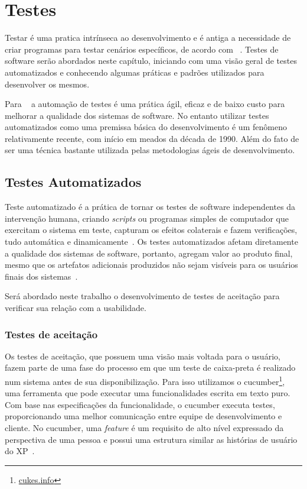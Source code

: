 
\chapter{Testes}
\label{cap:testes}

Testar é uma pratica intrínseca ao desenvolvimento e é antiga a necessidade de
criar programas para testar cenários específicos, de acordo com ~.
%
Testes de software serão abordados neste capítulo, iniciando com uma visão geral de testes 
automatizados e conhecendo algumas práticas e padrões utilizados para desenvolver
os mesmos.

Para ~ a automação de testes é uma prática ágil, eficaz e de baixo custo para melhorar
a qualidade dos sistemas de software. No entanto utilizar testes automatizados 
como uma premissa básica do desenvolvimento é um fenômeno relativamente recente, 
com início em meados  da década de 1990. Além do fato de ser uma técnica bastante utilizada pelas metodologias ágeis
de desenvolvimento.


\section{Testes Automatizados}

Teste automatizado é a prática de tornar os testes de software independentes da
intervenção humana, criando \textit{scripts} ou programas simples de computador que exercitam 
o sistema em teste, capturam os efeitos colaterais e fazem verificações, tudo 
automática e dinamicamente~\cite{meszaros2007}.
%
Os testes automatizados afetam diretamente a qualidade dos sistemas de software,
portanto, agregam valor  ao produto final, mesmo que os artefatos adicionais
produzidos não sejam visíveis para os usuários finais dos sistemas~\cite{bernardo2011}.

Será abordado neste trabalho o desenvolvimento de testes de aceitação para verificar sua relação com a usabilidade. 

\subsection{Testes de aceitação}

Os testes de aceitação, que possuem uma visão mais voltada para o usuário, fazem 
parte de uma fase do processo em que um teste de caixa-preta é realizado 
num sistema antes de sua disponibilização.
Para isso utilizamos o cucumber\footnote{\url{cukes.info}}, uma ferramenta que pode executar uma funcionalidades escrita em texto puro. Com base nas especificações da funcionalidade, o cucumber executa testes, proporcionando uma melhor comunicação entre equipe de desenvolvimento e cliente.
%
No cucumber, uma \textit{feature} é um requisito de alto nível 
expressado da perspectiva de uma pessoa e possui uma estrutura similar as histórias 
de usuário do XP~\cite{chelimsky2010}. 



